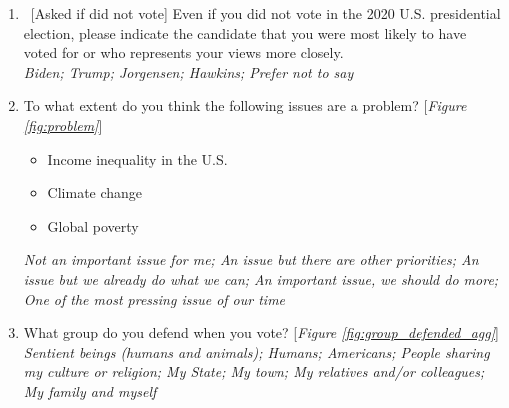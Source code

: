 \begin{enumerate}[resume]
\item ~[Asked if did not vote] Even if you did not vote in the 2020 U.S. presidential election, please indicate the candidate that you were most likely to have voted for or who represents your views more closely.
\\ \textit{Biden; Trump; Jorgensen; Hawkins; Prefer not to say}
\item \label{q:problem} To what extent do you think the following issues are a problem? [\textit{Figure \ref{fig:problem}}]
\begin{itemize}
    \item Income inequality in the U.S. 
    \item Climate change
    \item Global poverty
\end{itemize}
\textit{Not an important issue for me; An issue but there are other priorities; An issue but we already do what we can; An important issue, we should do more; One of the most pressing issue of our time}
\item \label{q:group_defended_agg} What group do you defend when you vote? [\textit{Figure \ref{fig:group_defended_agg}}]
\\ \textit{Sentient beings (humans and animals); Humans; Americans; People sharing my culture or religion; My State; My town; My relatives and/or colleagues; My family and myself}
\end{enumerate}

